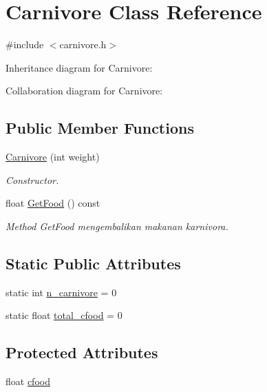 \hypertarget{classCarnivore}{}\section{Carnivore Class Reference}
\label{classCarnivore}


{\ttfamily \#include $<$carnivore.\+h$>$}



Inheritance diagram for Carnivore\+:


Collaboration diagram for Carnivore\+:
\subsection*{Public Member Functions}
\begin{DoxyCompactItemize}
\item 
\hyperlink{classCarnivore_a2346389567a28181cd49894a56834979}{Carnivore} (int weight)
\begin{DoxyCompactList}\small\item\em Constructor. \end{DoxyCompactList}\item 
float \hyperlink{classCarnivore_a1032e38dee235a21c3a6b5d77e9a7906}{Get\+Food} () const \hypertarget{classCarnivore_a1032e38dee235a21c3a6b5d77e9a7906}{}\label{classCarnivore_a1032e38dee235a21c3a6b5d77e9a7906}

\begin{DoxyCompactList}\small\item\em Method Get\+Food mengembalikan makanan karnivora. \end{DoxyCompactList}\end{DoxyCompactItemize}
\subsection*{Static Public Attributes}
\begin{DoxyCompactItemize}
\item 
static int \hyperlink{classCarnivore_ad134bd8ca67aed9b5fd59be18d8ae8b7}{n\+\_\+carnivore} = 0
\item 
static float \hyperlink{classCarnivore_ab449b336745a74e84784bfc13489ec15}{total\+\_\+cfood} = 0
\end{DoxyCompactItemize}
\subsection*{Protected Attributes}
\begin{DoxyCompactItemize}
\item 
float \hyperlink{classCarnivore_af1b6929b2e0d7204ad0c0a865fe6e96b}{cfood}
\end{DoxyCompactItemize}


